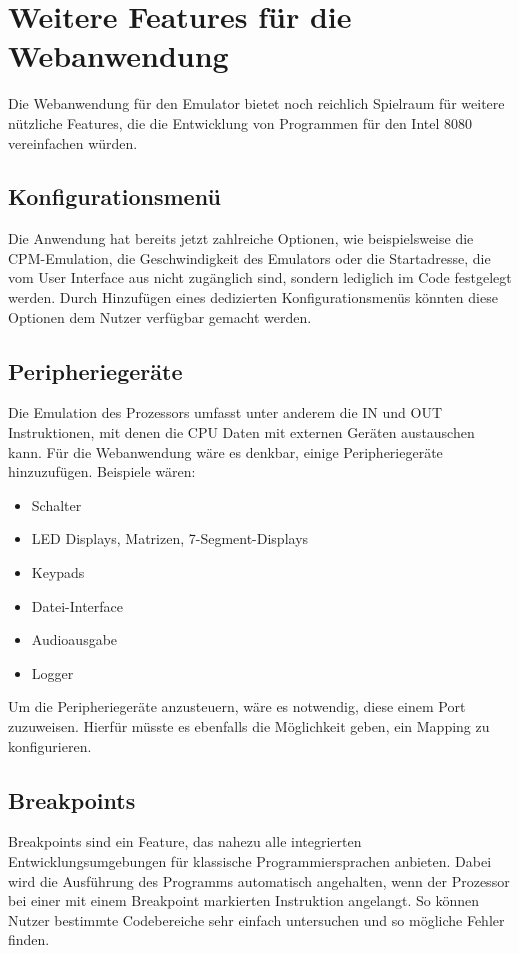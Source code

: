 \section{Weitere Features für die Webanwendung}

Die Webanwendung für den Emulator bietet noch reichlich Spielraum für weitere nützliche Features, die die Entwicklung von Programmen für den Intel 8080 vereinfachen würden.

\subsection{Konfigurationsmenü}

Die Anwendung hat bereits jetzt zahlreiche Optionen, wie beispielsweise die \ac{CPM}-Emulation, die Geschwindigkeit des Emulators oder die Startadresse, die vom User Interface aus nicht zugänglich sind, sondern lediglich im Code festgelegt werden. Durch Hinzufügen eines dedizierten Konfigurationsmenüs könnten diese Optionen dem Nutzer verfügbar gemacht werden.

\subsection{Peripheriegeräte}

Die Emulation des Prozessors umfasst unter anderem die IN und OUT Instruktionen, mit denen die CPU Daten mit externen Geräten austauschen kann. Für die Webanwendung wäre es denkbar, einige Peripheriegeräte hinzuzufügen. Beispiele wären:

\begin{itemize}
    \item Schalter
    \item LED Displays, Matrizen, 7-Segment-Displays
    \item Keypads
    \item Datei-Interface
    \item Audioausgabe
    \item Logger
\end{itemize}

Um die Peripheriegeräte anzusteuern, wäre es notwendig, diese einem Port zuzuweisen. Hierfür müsste es ebenfalls die Möglichkeit geben, ein Mapping zu konfigurieren.

\subsection{Breakpoints}

Breakpoints sind ein Feature, das nahezu alle integrierten Entwicklungsumgebungen für klassische Programmiersprachen anbieten. Dabei wird die Ausführung des Programms automatisch angehalten, wenn der Prozessor bei einer mit einem Breakpoint markierten Instruktion angelangt. So können Nutzer bestimmte Codebereiche sehr einfach untersuchen und so mögliche Fehler finden.

